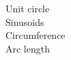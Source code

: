 \documentclass[preview]{standalone}
\begin{document}
Unit circle\\Sinusoids\\Circumference\\Arc length\\
\end{document}
